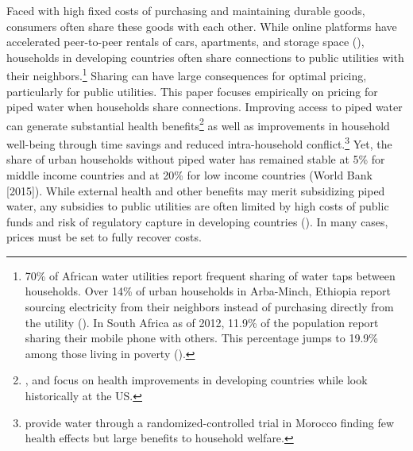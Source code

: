 \documentclass[12pt]{article}
\begin{document}
Faced with high fixed costs of purchasing and maintaining durable goods, consumers often share these goods with each other.  While online platforms have accelerated peer-to-peer rentals of cars, apartments, and storage space (\cite{horton2016owning}), households in developing countries often share connections to public utilities with their neighbors.\footnote{70\% of African water utilities report frequent sharing of water taps between households.  Over 14\% of urban households in Arba-Minch, Ethiopia report sourcing electricity from their neighbors instead of purchasing directly from the utility (\cite{mustefa2016energy}).  In South Africa as of 2012, 11.9\% of the population report sharing their mobile phone with others.  This percentage jumps to 19.9\% among those living in poverty (\cite{calandro2012mobile}).}  Sharing can have large consequences for optimal pricing, particularly for public utilities.  This paper focuses empirically on pricing for piped water when households share connections.  Improving access to piped water can generate substantial health benefits\footnote{\cite{zhang2016long,kosec2014child,gamper2010impact}, and \cite{galiani2005water} focus on health improvements in developing countries while \cite{cutler2005role} look historically at the US.} as well as improvements in household well-being through time savings and reduced intra-household conflict.\footnote{\cite{devoto2012happiness} provide water through a randomized-controlled trial in Morocco finding few health effects but large benefits to household welfare.}  Yet, the share of urban households without piped water has remained stable at 5\% for middle income countries and at 20\% for low income countries (World Bank [2015]).  While external health and other benefits may merit subsidizing piped water, any subsidies to public utilities are often limited by high costs of public funds and risk of regulatory capture in developing countries (\cite{laffont2005regulation}).  In many cases, prices must be set to fully recover costs.


\end{document}
